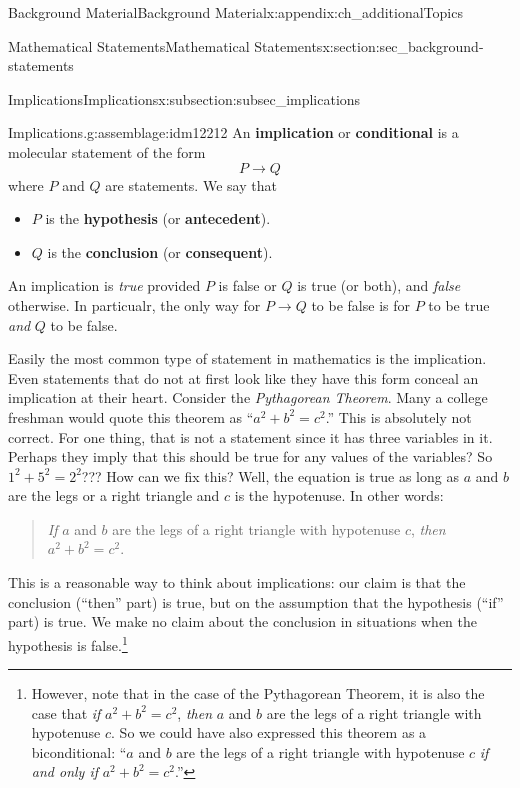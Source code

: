\documentclass[oneside,10pt,]{book}
\newcommand{\terminology}[1]{\textbf{#1}}
\numberwithin{equation}{chapter}
\def\imp{\rightarrow}
\begin{document}
\begin{appendixptx}{Background Material}{}{Background Material}{}{}{x:appendix:ch_additionalTopics}
\begin{sectionptx}{Mathematical Statements}{}{Mathematical Statements}{}{}{x:section:sec_background-statements}
%
%
\typeout{************************************************}
\typeout{************************************************}
%
\begin{subsectionptx}{Implications}{}{Implications}{}{}{x:subsection:subsec_implications}
\begin{assemblage}{Implications.}{g:assemblage:idm12212}%
An \terminology{implication} or \terminology{conditional} is a molecular statement of the form%
\begin{equation*}
P \imp Q
\end{equation*}
where \(P\) and \(Q\) are statements.  We say that%
\begin{itemize}[label=\textbullet]
\item{}\(P\) is the \terminology{hypothesis} (or \terminology{antecedent}).%
\item{}\(Q\) is the \terminology{conclusion} (or \terminology{consequent}).%
\end{itemize}
%
\par
An implication is \emph{true} provided \(P\) is false or  \(Q\) is true (or both), and \emph{false} otherwise.  In particualr, the only way for \(P \imp Q\) to be false is for \(P\) to be true \emph{and} \(Q\) to be false.%
\end{assemblage}
Easily the most common type of statement in mathematics is the implication. Even statements that do not at first look like they have this form conceal an implication at their heart. Consider the \emph{Pythagorean Theorem}. Many a college freshman would quote this theorem as ``\(a^2 + b^2 = c^2\).'' This is absolutely not correct. For one thing, that is not a statement since it has three variables in it. Perhaps they imply that this should be true for any values of the variables?  So \(1^2 + 5^2 = 2^2\)??? How can we fix this? Well, the equation is true as long as \(a\) and \(b\) are the legs or a right triangle and \(c\) is the hypotenuse. In other words:%
\begin{quote}%
\emph{If} \(a\) and \(b\) are the legs of a right triangle with hypotenuse \(c\), \emph{then} \(a^2 + b^2 = c^2\).%
\end{quote}
This is a reasonable way to think about implications: our claim is that the conclusion (``then'' part) is true, but on the assumption that the hypothesis (``if'' part) is true. We make no claim about the conclusion in situations when the hypothesis is false.\footnote{However, note that in the case of the Pythagorean Theorem, it is also the case that \emph{if} \(a^2 + b^2 = c^2\), \emph{then} \(a\) and \(b\) are the legs of a right triangle with hypotenuse \(c\).  So we could have also expressed this theorem as a biconditional: ``\(a\) and \(b\) are the legs of a right triangle with hypotenuse \(c\) \emph{if and only if} \(a^2 + b^2 = c^2\).''\label{g:fn:idm12261}}%

\end{subsectionptx}
\end{sectionptx}
\end{appendixptx}
\end{document}

